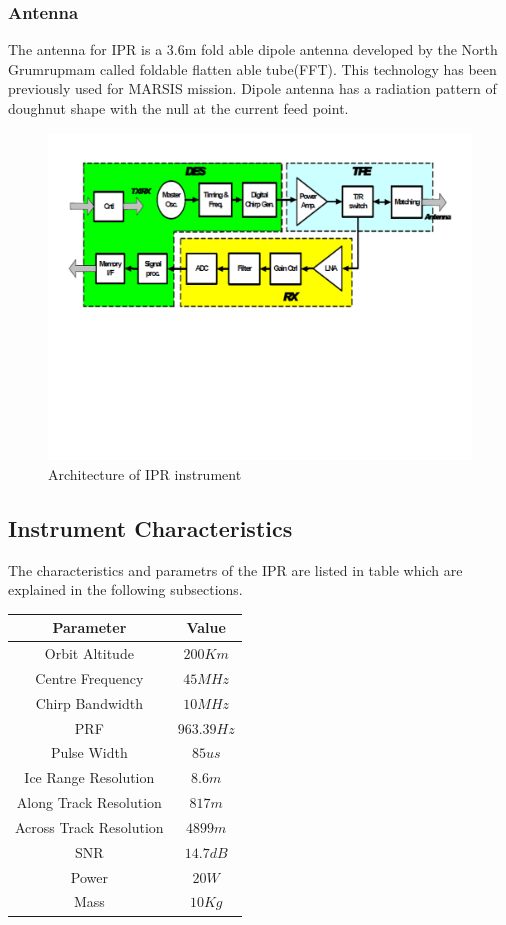 \subsubsection{Antenna}
The antenna for \ac{IPR} is a 3.6m fold able dipole antenna developed by the North Grumrupmam called foldable flatten able tube(FFT). This technology  has been previously used for \ac{MARSIS} mission. Dipole antenna has a radiation pattern of doughnut shape with the null at the  current feed point.
\begin{figure}[bht]
\centering
\includegraphics[scale=0.5]{Figures/IPR_Architecture.pdf}
\caption{Architecture of \ac{IPR} instrument \cite{IPR_performance}}
\label{fig:IPR_achitecture}
\end{figure}
%
\subsection{Instrument Characteristics}
The characteristics and parametrs of the \ac{IPR} are listed in table which are explained in the following subsections.\\
\begin{tabular}{|c|c|}
\hline 	\textbf{Parameter}		&  \textbf{Value}\\ 
\hline  Orbit Altitude			&  $200 Km$	\\ 
\hline  Centre Frequency		&  $45 MHz$		\\ 
\hline  Chirp Bandwidth			&  $10 MHz$		\\
\hline  PRF						&  $963.39 Hz$	\\  
\hline  Pulse Width				&  $85 us$		\\ 
\hline  Ice Range Resolution	&  $8.6 m$		\\
\hline  Along Track Resolution	&  $817 m$		\\ 
\hline  Across Track Resolution	&  $4899 m$		\\ 
\hline  SNR						&  $14.7 dB$	\\ 
\hline  Power					&  $20 W$		\\ 
\hline  Mass					&  $10 Kg$		\\ 
\hline 
\end{tabular} 
